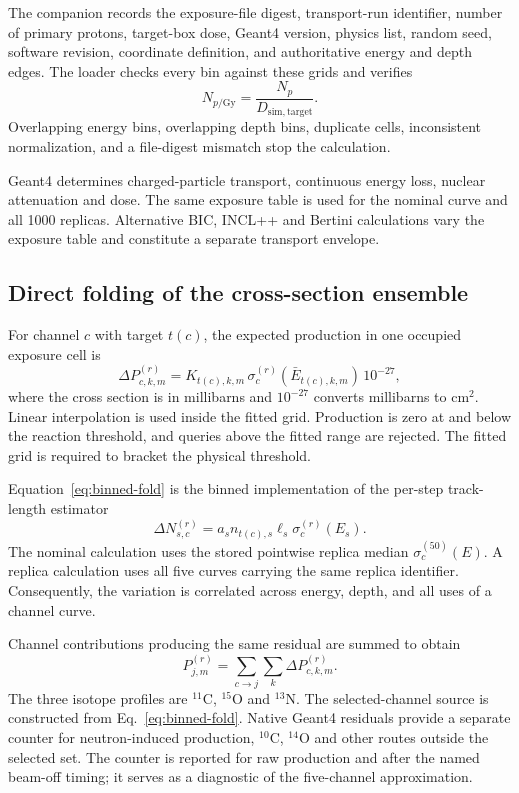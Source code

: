 \documentclass[11pt]{article}
\begin{document}
The companion  records the exposure-file digest,
transport-run identifier, number of primary protons, target-box dose, Geant4
version, physics list, random seed, software revision, coordinate definition,
and authoritative energy and depth edges.  The loader checks every bin against
these grids and verifies
\begin{equation}
  N_{p/\mathrm{Gy}}=\frac{N_p}{D_{\mathrm{sim,target}}}.
  \label{eq:normalization-check}
\end{equation}
Overlapping energy bins, overlapping depth bins, duplicate cells, inconsistent
normalization, and a file-digest mismatch stop the calculation.

Geant4 determines charged-particle transport, continuous energy loss, nuclear
attenuation and dose.  The same exposure table is used for the nominal curve
and all 1000 replicas.  Alternative BIC, INCL++ and Bertini calculations vary
the exposure table and constitute a separate transport envelope.

\subsection{Direct folding of the cross-section ensemble}

For channel $c$ with target $t(c)$, the expected production in one occupied
exposure cell is
\begin{equation}
  \Delta P_{c,k,m}^{(r)}=
  K_{t(c),k,m}\,
  \sigma_c^{(r)}(\bar E_{t(c),k,m})\,10^{-27},
  \label{eq:binned-fold}
\end{equation}
where the cross section is in millibarns and $10^{-27}$ converts millibarns to
cm$^2$.  Linear interpolation is used inside the fitted grid.  Production is
zero at and below the reaction threshold, and queries above the fitted range
are rejected.  The fitted grid is required to bracket the physical threshold.

Equation~\eqref{eq:binned-fold} is the binned implementation of the per-step
track-length estimator
\begin{equation}
  \Delta N_{s,c}^{(r)}=
  a_s n_{t(c),s}\ell_s\sigma_c^{(r)}(E_s).
  \label{eq:fold-step}
\end{equation}
The nominal calculation uses the stored pointwise replica median
$\sigma_c^{(50)}(E)$.  A replica calculation uses all five curves carrying the
same replica identifier.  Consequently, the variation is correlated across
energy, depth, and all uses of a channel curve.

Channel contributions producing the same residual are summed to obtain
\begin{equation}
  P_{j,m}^{(r)}=
  \sum_{c\rightarrow j}\sum_k\Delta P_{c,k,m}^{(r)}.
  \label{eq:isotope-profile}
\end{equation}
The three isotope profiles are $^{11}$C, $^{15}$O and $^{13}$N.
The selected-channel source is constructed from Eq.~\eqref{eq:binned-fold}.
Native Geant4 residuals provide a separate counter for neutron-induced
production, $^{10}$C, $^{14}$O and other routes outside the selected set.  The
counter is reported for raw production and after the named beam-off timing; it
serves as a diagnostic of the five-channel approximation.
\end{document}
